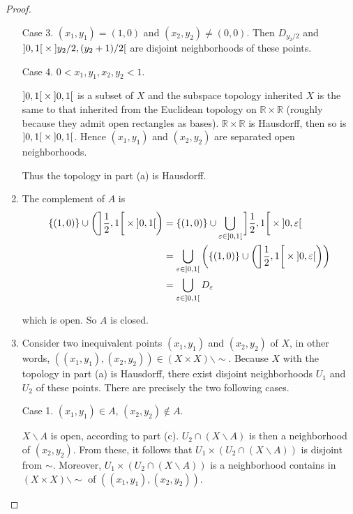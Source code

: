 \begin{proof}
\begin{enumerate}[label={(\alph*)}]
		      Case 3. $(x_{1}, y_{1}) = (1, 0)$ and $(x_{2}, y_{2}) \ne (0, 0)$. Then $D_{y_{2}/2}$ and $\left]{0, 1}\right[\times\left]{y_{2}/2, (y_{2}+1)/2}\right[$ are disjoint neighborhoods of these points.

		      Case 4. $0 < x_{1}, y_{1}, x_{2}, y_{2} < 1$.

		      $\left]{0, 1}\right[\times \left]{0, 1}\right[$ is a subset of $X$ and the subspace topology inherited $X$ is the same to that inherited from the Euclidean topology on $\mathbb{R}\times\mathbb{R}$ (roughly because they admit open rectangles as bases). $\mathbb{R}\times\mathbb{R}$ is Hausdorff, then so is $\left]{0, 1}\right[\times \left]{0, 1}\right[$. Hence $(x_{1}, y_{1})$ and $(x_{2}, y_{2})$ are separated open neighborhoods.

		      Thus the topology in part (a) is Hausdorff.
		\item The complement of $A$ is
		      \begin{align*}
			      \left\{{(1, 0)}\right\} \cup \left( \left]{\frac{1}{2}, 1}\right[ \times \left]{0, 1}\right[ \right) & = \left\{{(1, 0)}\right\} \cup \bigcup_{\varepsilon\in\left]{0,1}\right[} \left]{\frac{1}{2}, 1}\right[ \times \left]{0, \varepsilon}\right[                           \\
			                                                                                                & = \bigcup_{\varepsilon\in\left]{0,1}\right[} \left(\left\{{(1, 0)}\right\} \cup \left(\left]{\frac{1}{2}, 1}\right[ \times \left]{0, \varepsilon}\right[\right)\right) \\
			                                                                                                & = \bigcup_{\varepsilon\in\left]{0,1}\right[} D_{\varepsilon}
		      \end{align*}

		      which is open. So $A$ is closed.
		\item Consider two inequivalent points $(x_{1}, y_{1})$ and $(x_{2}, y_{2})$ of $X$, in other words, $\left((x_{1}, y_{1}), (x_{2}, y_{2})\right) \in (X\times X)\smallsetminus\sim$. Because $X$ with the topology in part (a) is Hausdorff, there exist disjoint neighborhoods $U_{1}$ and $U_{2}$ of these points. There are precisely the two following cases.

		      Case 1. $(x_{1}, y_{1}) \in A$, $(x_{2}, y_{2}) \notin A$.

		      $X\smallsetminus A$ is open, according to part (c). $U_{2}\cap (X\smallsetminus A)$ is then a neighborhood of $(x_{2}, y_{2})$. From these, it follows that $U_{1} \times (U_{2}\cap (X\smallsetminus A))$ is disjoint from $\sim$. Moreover, $U_{1} \times (U_{2}\cap (X\smallsetminus A))$ is a neighborhood contains in $(X\times X)\smallsetminus\sim$ of $\left((x_{1}, y_{1}), (x_{2}, y_{2})\right)$.


\end{enumerate}
\end{proof}
